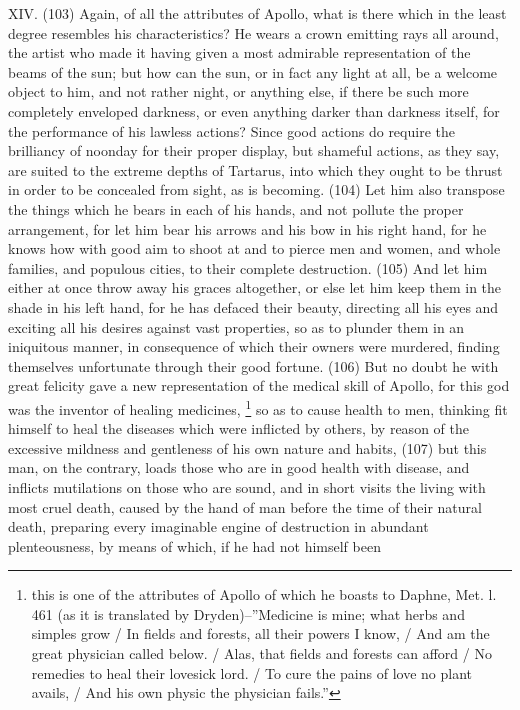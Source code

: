 XIV. (103) Again, of all the attributes of Apollo, what is there which in the least degree resembles
his characteristics? He wears a crown emitting rays all around, the artist who made it having given
a most admirable representation of the beams of the sun; but how can the sun, or in fact any light
at all, be a welcome object to him, and not rather night, or anything else, if there be such more
completely enveloped darkness, or even anything darker than darkness itself, for the performance
of his lawless actions? Since good actions do require the brilliancy of noonday for their proper
display, but shameful actions, as they say, are suited to the extreme depths of Tartarus, into which
they ought to be thrust in order to be concealed from sight, as is becoming. (104) Let him also
transpose the things which he bears in each of his hands, and not pollute the proper arrangement,
for let him bear his arrows and his bow in his right hand, for he knows how with good aim to shoot
at and to pierce men and women, and whole families, and populous cities, to their complete
destruction. (105) And let him either at once throw away his graces altogether, or else let him keep
them in the shade in his left hand, for he has defaced their beauty, directing all his eyes and
exciting all his desires against vast properties, so as to plunder them in an iniquitous manner, in
consequence of which their owners were murdered, finding themselves unfortunate through their
good fortune. (106) But no doubt he with great felicity gave a new representation of the medical
skill of Apollo, for this god was the inventor of healing medicines, \footnote{this is one of the attributes of Apollo of
which he boasts to Daphne, Met. l. 461 (as it is translated by Dryden)--''Medicine is mine; what herbs and simples grow /
In fields and forests, all their powers I know, / And am the great physician called below. / Alas, that fields and forests can
afford / No remedies to heal their lovesick lord. / To cure the pains of love no plant avails, / And his own physic the
physician fails.''} so as to cause health to men, thinking fit himself to heal the diseases which were
inflicted by others, by reason of the excessive mildness and gentleness of his own nature and
habits, (107) but this man, on the contrary, loads those who are in good health with disease, and
inflicts mutilations on those who are sound, and in short visits the living with most cruel death,
caused by the hand of man before the time of their natural death, preparing every imaginable
engine of destruction in abundant plenteousness, by means of which, if he had not himself been
